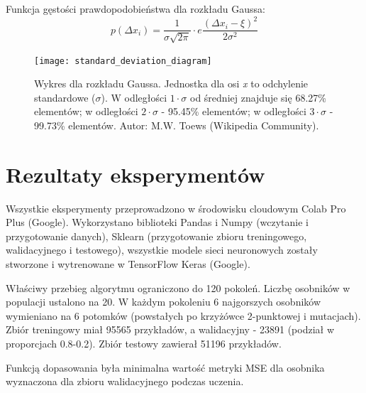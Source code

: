 \documentclass[a4paper,11pt]{article}
\begin{document}
    \bigskip

    \noindent
    \begin{minipage}[H]{\textwidth}
        \setlength\parindent{17pt} Funkcja gęstości prawdopodobieństwa dla rozkładu Gaussa: \\
        \begin{equation}
            \label{eq:mutation_probability distribution}
            p(\Delta x_{i}) = \frac{1}{\sigma \sqrt {2 \pi}} \cdot e \frac{(\Delta x_{i} - \xi)^{2}}{2 \sigma^{2}}
        \end{equation}
    \end{minipage}

    \bigskip

    \begin{figure}[H]
        \label{fig:standard_deviation_diagram}
        \centering
        \texttt{[image: standard\_deviation\_diagram]}
        \caption{Wykres dla rozkładu Gaussa. Jednostka dla osi \textit{x} to odchylenie standardowe ($\sigma$). W odległości $1 \cdot \sigma$ od średniej znajduje się 68.27\% elementów; w odległości $2 \cdot \sigma$ - 95.45\% elementów; w odległości $3 \cdot \sigma$ - 99.73\% elementów. Autor: M.W. Toews (Wikipedia Community).}
    \end{figure}

    \newpage


    \section{Rezultaty eksperymentów}

    Wszystkie eksperymenty przeprowadzono w środowisku cloudowym Colab Pro Plus (Google). Wykorzystano biblioteki Pandas i Numpy (wczytanie i przygotowanie danych), Sklearn (przygotowanie zbioru treningowego, walidacyjnego i testowego), wszystkie modele sieci neuronowych zostały stworzone i wytrenowane w TensorFlow Keras (Google).

    \bigskip

    Właściwy przebieg algorytmu ograniczono do 120 pokoleń. Liczbę osobników w populacji ustalono na 20. W każdym pokoleniu 6 najgorszych osobników wymieniano na 6 potomków (powstałych po krzyżówce 2-punktowej i mutacjach). Zbiór treningowy miał 95565 przykładów, a walidacyjny - 23891 (podział w proporcjach 0.8-0.2). Zbiór testowy zawierał 51196 przykładów.

    \bigskip

    Funkcją dopasowania była minimalna wartość metryki MSE dla osobnika wyznaczona dla zbioru walidacyjnego podczas uczenia.
\end{document}
